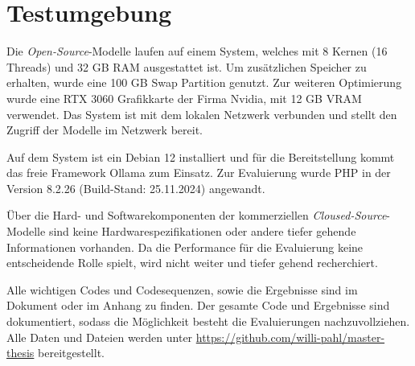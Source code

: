 

\section{Testumgebung}
Die \textit{Open-Source}-Modelle laufen auf einem System, welches mit 8 Kernen (16 Threads) und 32 GB RAM ausgestattet ist. Um zusätzlichen Speicher zu erhalten, wurde eine 100 GB Swap Partition genutzt. Zur weiteren Optimierung wurde eine RTX 3060 Grafikkarte der Firma Nvidia, mit 12 GB VRAM verwendet. Das System ist mit dem lokalen Netzwerk verbunden und stellt den Zugriff der Modelle im Netzwerk bereit.\vspace{0.2cm}

Auf dem System ist ein Debian 12 installiert und für die Bereitstellung kommt das freie Framework Ollama zum Einsatz. Zur Evaluierung wurde PHP in der Version 8.2.26 (Build-Stand: 25.11.2024) angewandt.\vspace{0.2cm}

Über die Hard- und Softwarekomponenten der kommerziellen \textit{Cloused-Source}-Modelle sind keine Hardwarespezifikationen oder andere tiefer gehende Informationen vorhanden. Da die Performance für die Evaluierung keine entscheidende Rolle spielt, wird nicht weiter und tiefer gehend recherchiert. \vspace{0.2cm}

Alle wichtigen Codes und Codesequenzen, sowie die Ergebnisse sind im Dokument oder im Anhang zu finden. Der gesamte Code und Ergebnisse sind dokumentiert, sodass die Möglichkeit besteht die Evaluierungen nachzuvollziehen. Alle Daten und Dateien werden unter \href{https://github.com/willi-pahl/master-thesis}{https://github.com/willi-pahl/master-thesis} bereitgestellt.\vspace{0.2cm}
